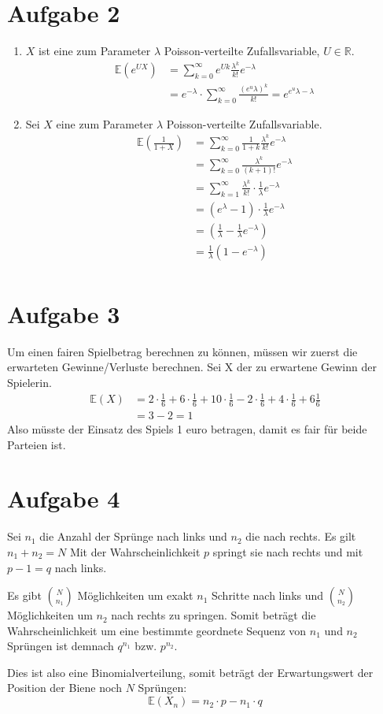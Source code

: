 \documentclass[10pt,a4paper,parskip=half]{scrartcl}
\newcommand{\E}{\mathbb{E}}
\newcommand{\R}{\mathbb{R}}
\begin{document}
\section*{Aufgabe 2}
\begin{enumerate}
\item $X$ ist eine zum Parameter $\lambda$ Poisson-verteilte Zufallsvariable, $U \in \R$.
\begin{align*}
\E(e^{UX}) &= \sum^{\infty}_{k=0} e^{Uk}\frac{\lambda^k}{k!} e^{-\lambda} \\
&= e^{-\lambda}\cdot \sum_{k=0}^{\infty} \frac{(e^u\lambda)^k}{k!} = e^{e^u\lambda - \lambda}
\end{align*}
\item Sei $X$ eine zum Parameter $\lambda$ Poisson-verteilte Zufallsvariable.
\begin{align*}
\E\left(\frac{1}{1+X}\right) &= \sum^{\infty}_{k=0} \frac{1}{1+k}\frac{\lambda^k}{k!} e^{-\lambda} \\
&= \sum^{\infty}_{k=0} \frac{\lambda^k}{(k+1)!} e^{-\lambda} \\
&= \sum^{\infty}_{k=1} \frac{\lambda^{k}}{k!}\cdot \frac1\lambda e^{-\lambda} \\
&= (e^\lambda - 1) \cdot \frac1\lambda e^{-\lambda} \\
&= (\frac1\lambda  - \frac1\lambda e^{-\lambda}) \\
&= \frac{1}{\lambda}(1 - e^{-\lambda}) \\
\end{align*}
\end{enumerate}
\section*{Aufgabe 3}
Um einen fairen Spielbetrag berechnen zu können, müssen wir zuerst die erwarteten Gewinne/Verluste berechnen. Sei X der zu erwartene Gewinn der Spielerin.
\begin{align*}
\E(X) &= 2 \cdot \frac{1}{6} + 6 \cdot \frac{1}{6} + 10 \cdot \frac{1}{6}  - 2 \cdot \frac{1}{6} + 4 \cdot \frac{1}{6} + 6 \frac{1}{6} \\
&= 3 - 2 = 1
\end{align*}
Also müsste der Einsatz des Spiels 1 euro betragen, damit es fair für beide Parteien ist.
\section*{Aufgabe 4}
Sei $n_1$ die Anzahl der Sprünge nach links und $n_2$ die nach rechts. Es gilt $n_1 + n_2 = N$
Mit der Wahrscheinlichkeit $p$ springt sie nach rechts und mit $p - 1 = q$ nach links.

Es gibt $\binom{N}{n_1}$ Möglichkeiten um exakt $n_1$ Schritte nach links und $\binom{N}{n_2}$ Möglichkeiten um $n_2$ nach rechts zu springen.
Somit beträgt die Wahrscheinlichkeit um eine bestimmte geordnete Sequenz von $n_1$ und $n_2$ Sprüngen ist demnach $q^{n_1}$ bzw. $p^{n_2}$.

Dies ist also eine Binomialverteilung, somit beträgt der Erwartungswert der Position der Biene noch $N$ Sprüngen:
$$\E(X_n) = n_2 \cdot p - n_1 \cdot q$$
\end{document}
